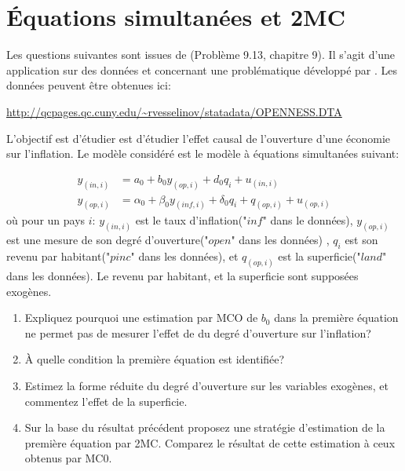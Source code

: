 \newpage

\tableofcontents

\newpage

\section{Équations simultanées et 2MC }

Les questions suivantes sont issues de \cite{Wooldridge2010}(Problème 9.13, chapitre 9). 
Il s'agit d'une application sur des données et concernant une problématique développé par \cite{Romer1993QJE}. Les données peuvent être obtenues ici: 

\medskip

\url{http://qcpages.qc.cuny.edu/~rvesselinov/statadata/OPENNESS.DTA}

\medskip

L'objectif est d'étudier est d'étudier l'effet causal de l'ouverture d'une économie sur l'inflation. 
Le modèle considéré est le modèle à équations simultanées suivant:

\begin{align*}
	y_{(in,i)} &= a_0 + b_0 y_{(op, i)} + d_0 q_i + u_{(in,i)}\\
	y_{(op,i)} &= \alpha_0 + \beta_0 y_{(inf, i)} + \delta_0 q_i  + q_{(op, i)}+ u_{(op,i)}
\end{align*}
où pour un pays $i$: $y_{(in,i)}$ est le taux d'inflation("$inf$" dans le données), 
$y_{(op,i)}$ est une mesure de son degré d'ouverture("$open$" dans les données) , 
$q_i$ est son revenu par habitant("$pinc$" dans les données), et $q_{(op, i)}$ 
est la superficie("$land$" dans les données). Le revenu par habitant, et la superficie sont supposées exogènes.

\begin{enumerate}
\item Expliquez pourquoi une estimation par MCO de $b_0$ dans la première équation ne permet pas de mesurer 
l'effet de du degré d'ouverture sur l'inflation?
\item À quelle condition la première équation est identifiée?
\item Estimez la forme réduite du degré d'ouverture sur les variables exogènes, et commentez l'effet de la superficie.
\item Sur la base du résultat précédent proposez une stratégie d'estimation de la première équation par 2MC.
 Comparez le résultat de cette estimation à ceux obtenus par MC0.  
\end{enumerate}


